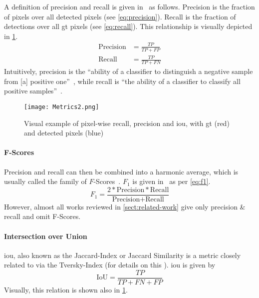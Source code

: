 A definition of precision and recall is given in~\cite[423]{Goodfellow.2016} as
follows. Precision is the fraction of 
pixels over all detected pixels (see \cref{eq:precision}). Recall is the fraction
of  detections over all \gls{gt} pixels
(see \cref{eq:recall}). This relationship is visually depicted in \cref{fig:visual-precision-recall}.
\begin{align}
    \label{eq:precision}\text{Precision}    &= \frac{TP}{TP + FP}\\
    \label{eq:recall}\text{Recall}          &= \frac{TP}{TP + FN}
\end{align}
Intuitively, precision is the ``ability of a classifier to distinguish a
negative sample from [a] positive one''~\cite{Younas.2017}, while
recall is ``the ability of a classifier to classify all positive samples''~\cite{Younas.2017}.
\begin{figure}
    \center
    \texttt{[image: Metrics2.png]}
    \caption[short={Visual example of pixel-wise recall, precision and \gls{iou}}]
    {Visual example of pixel-wise recall, precision and \gls{iou}, with
    \gls{gt} (red) and detected pixels (blue)}\label{fig:visual-precision-recall}
\end{figure}

\paragraph{F-Scores}\label{par:f-scores}
Precision and recall can then be combined into a harmonic average, which is usually
called the family of \(F\)-Scores~\cite[e.g.][183]{Murphy.2012}. \(F_1\) is given
in~\cite[183]{Murphy.2012} as per \cref{eq:f1}.
\begin{equation}\label{eq:f1}
    F_1=\frac{2*\text{Precision}*\text{Recall}}{\text{Precision} + \text{Recall}}
\end{equation}
However, almost all works reviewed in \cref{sect:related-work} give only
precision \& recall and omit F-Scores.

\paragraph{Intersection over Union}\label{par:iou}
\Gls{iou}, also known as the Jaccard-Index or Jaccard Similarity is a metric
closely related to  via the Tversky-Index (for details on
this \cite[cf.][Section 6.3 Similarity Measures]{James.2011}). \Gls{iou} is 
given by
\begin{equation}
    \text{IoU}=\frac{TP}{TP + FN + FP}
\end{equation}
Visually, this relation is shown also in \cref{fig:visual-precision-recall}.

